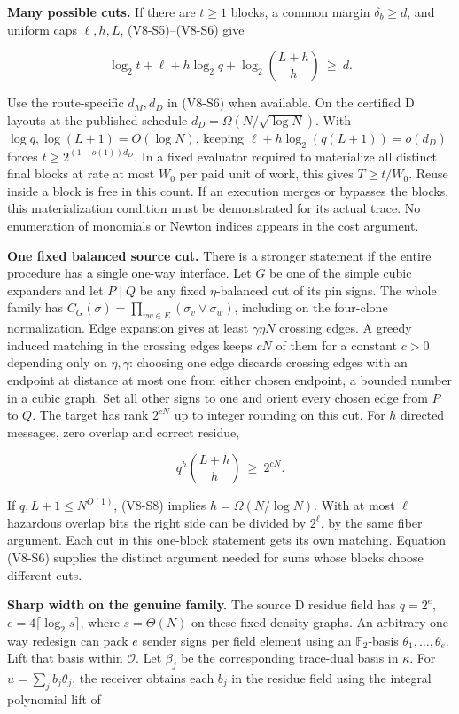 \documentclass[11pt,a4paper]{article}
\begin{document}
\textbf{Many possible cuts.} If there are \(t\ge1\) blocks, a common
margin \(\delta_b\ge d\), and uniform caps \(\ell,h,L\), (V8-S5)--(V8-S6) give

\[
 \log_2 t+\ell+h\log_2 q+\log_2{L+h\choose h}\ \ge\ d.               \tag{V8-S7}
\]

Use the route-specific \(d_M,d_D\) in (V8-S6) when available. On the
certified D layouts at the published schedule
\(d_D=\Omega(N/\sqrt{\log N})\). With \(\log q,\log(L+1)=O(\log N)\),
keeping \(\ell+h\log_2(q(L+1))=o(d_D)\) forces \(t\ge2^{(1-o(1))d_D}\).
In a fixed evaluator required to materialize all distinct final blocks
at rate at most \(W_0\) per paid unit of work, this gives
\(T\ge t/W_0\). Reuse inside a block is free in this count. If an
execution merges or bypasses the blocks, this materialization condition
must be demonstrated for its actual trace. No enumeration of monomials
or Newton indices appears in the cost argument.

\textbf{One fixed balanced source cut.} There is a stronger statement if
the entire procedure has a single one-way interface. Let \(G\) be one of
the simple cubic expanders and let \(P\mid Q\) be any fixed
\(\eta\)-balanced cut of its pin signs. The whole family has
\(C_G(\sigma)=\prod_{vw\in E}(\sigma_v\lor\sigma_w)\), including on the
four-clone normalization. Edge expansion gives at least \(\gamma\eta N\)
crossing edges. A greedy induced matching in the crossing edges keeps
\(cN\) of them for a constant \(c>0\) depending only on \(\eta,\gamma\):
choosing one edge discards crossing edges with an endpoint at distance
at most one from either chosen endpoint, a bounded number in a cubic
graph. Set all other signs to one and orient every chosen edge from
\(P\) to \(Q\). The target has rank \(2^{cN}\) up to integer rounding on
this cut. For \(h\) directed messages, zero overlap and correct residue,

\[
             q^h {L+h\choose h}\ \ge\ 2^{cN}.
                                                                    \tag{V8-S8}
\]

If \(q,L+1\le N^{O(1)}\), (V8-S8) implies \(h=\Omega(N/\log N)\). With at
most \(\ell\) hazardous overlap bits the right side can be divided by
\(2^\ell\), by the same fiber argument. Each cut in this one-block
statement gets its own matching. Equation (V8-S6) supplies the distinct
argument needed for sums whose blocks choose different cuts.

\textbf{Sharp width on the genuine family.} The source D residue field
has \(q=2^e\), \(e=4\lceil\log_2 s\rceil\), where \(s=\Theta(N)\) on
these fixed-density graphs. An arbitrary one-way redesign can pack \(e\)
sender signs per field element using an \(\mathbb F_2\)-basis
\(\theta_1,\ldots,\theta_e\). Lift that basis within \(\mathcal O\). Let
\(\beta_j\) be the corresponding trace-dual basis in \(\kappa\). For
\(u=\sum_j b_j\theta_j\), the receiver obtains each \(b_j\) in the
residue field using the integral polynomial lift of
\end{document}
